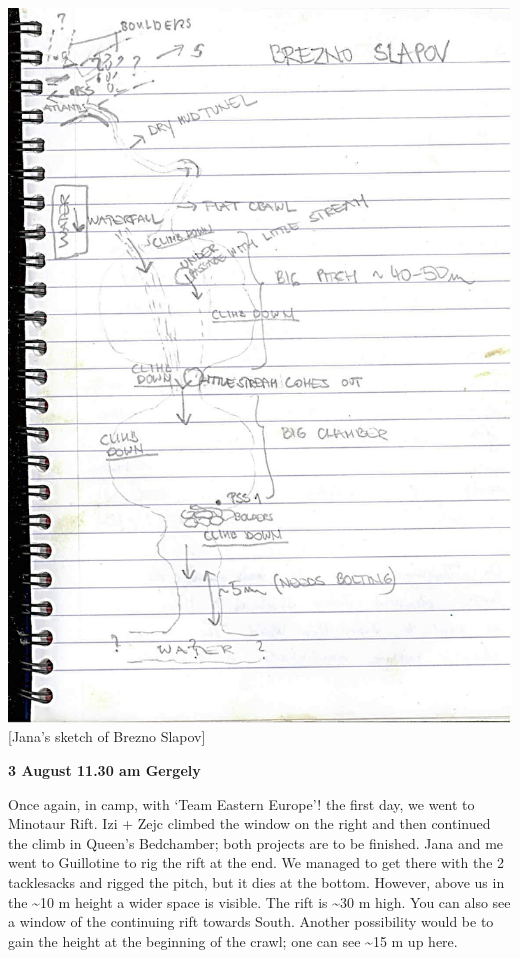 \includegraphics{UgLog1012/84.jpeg}\\
{[}Jana's sketch of Brezno Slapov{]}

\textbf{3 August 11.30 am Gergely}

Once again, in camp, with `Team Eastern Europe'! the first day, we went
to Minotaur Rift. Izi + Zejc climbed the window on the right and then
continued the climb in Queen's Bedchamber; both projects are to be
finished. Jana and me went to Guillotine to rig the rift at the end. We
managed to get there with the 2 tacklesacks and rigged the pitch, but it
dies at the bottom. However, above us in the \textasciitilde 10 m height
a wider space is visible. The rift is \textasciitilde 30 m high. You can
also see a window of the continuing rift towards South. Another
possibility would be to gain the height at the beginning of the crawl;
one can see \textasciitilde 15 m up here.

